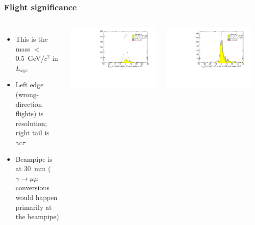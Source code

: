 \documentclass[compress]{beamer}
\begin{document}
\begin{frame}
\frametitle{Flight significance}

\begin{columns}
\begin{itemize}
\item This is the mass $<$ 0.5~GeV/$c^2$ in $L_{xyz}$

\item Left edge (wrong-direction flights) is resolution; right tail is $\gamma c \tau$

\item Beampipe is at 30~mm ($\gamma \to \mu\mu$ conversions would
  happen primarily at the beampipe)
\end{itemize}

\includegraphics[width=\linewidth]{lowdimuon_lxyz_lowmass_isolated.pdf}

\includegraphics[width=\linewidth]{lowdimuon_lxyz_lowmass_isosideband.pdf}


\end{columns}
\end{frame}
\end{document}
